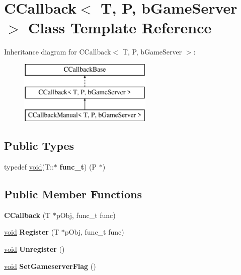 \hypertarget{classCCallback}{}\section{C\+Callback$<$ T, P, b\+Game\+Server $>$ Class Template Reference}
\label{classCCallback}
Inheritance diagram for C\+Callback$<$ T, P, b\+Game\+Server $>$\+:\begin{figure}[H]
\begin{center}
\leavevmode
\includegraphics[height=3.000000cm]{classCCallback}
\end{center}
\end{figure}
\subsection*{Public Types}
\begin{DoxyCompactItemize}
\item 
\hypertarget{classCCallback_a47021bc92f07712b8c21cfed864b9806}{}typedef \hyperlink{SDL__audio_8h_a52835ae37c4bb905b903cbaf5d04b05f}{void}(T\+::$\ast$ {\bfseries func\+\_\+t}) (P $\ast$)\label{classCCallback_a47021bc92f07712b8c21cfed864b9806}

\end{DoxyCompactItemize}
\subsection*{Public Member Functions}
\begin{DoxyCompactItemize}
\item 
\hypertarget{classCCallback_aabe5ce9e7247aa23734d4438a71365dd}{}{\bfseries C\+Callback} (T $\ast$p\+Obj, func\+\_\+t func)\label{classCCallback_aabe5ce9e7247aa23734d4438a71365dd}

\item 
\hypertarget{classCCallback_a9c7fc43badf15fc74e9e151fa7fb2b92}{}\hyperlink{SDL__audio_8h_a52835ae37c4bb905b903cbaf5d04b05f}{void} {\bfseries Register} (T $\ast$p\+Obj, func\+\_\+t func)\label{classCCallback_a9c7fc43badf15fc74e9e151fa7fb2b92}

\item 
\hypertarget{classCCallback_a4f54ad4793e18c137ac0ff5d43355004}{}\hyperlink{SDL__audio_8h_a52835ae37c4bb905b903cbaf5d04b05f}{void} {\bfseries Unregister} ()\label{classCCallback_a4f54ad4793e18c137ac0ff5d43355004}

\item 
\hypertarget{classCCallback_a7ffb23a0e48eae037c481f83ce5aa874}{}\hyperlink{SDL__audio_8h_a52835ae37c4bb905b903cbaf5d04b05f}{void} {\bfseries Set\+Gameserver\+Flag} ()\label{classCCallback_a7ffb23a0e48eae037c481f83ce5aa874}

\end{DoxyCompactItemize}

